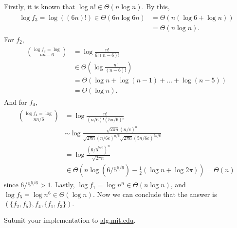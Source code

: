 \documentclass[12pt,twoside]{article}
\begin{document}
\begin{problems}
\begin{problemparts}
  \problempart %
  Firstly, it is known that $\log n! \in \Theta(n\log n)$. By this,
  \begin{align}
    \begin{split}
      \log f_3 = \log((6n)!) \in \Theta(6n\log{6n}) &= \Theta(n(\log 6 + \log n)) \\
                                                    &= \Theta(n\log n).
    \end{split}
  \end{align}
  For $f_2$,
  \begin{align}
    \begin{split}
      \log f_2 = \log\choose{n}{n-6} &= \log\frac{n!}{6!(n-6)!} \\
                                     &\in \Theta\left(\log\frac{n!}{(n-6)!}\right) \\
                                     &= \Theta(\log n + \log(n-1) + \dots + \log(n-5)) \\
                                     &= \Theta(\log n).
    \end{split}
  \end{align}
  And for $f_4$,
  \begin{align}
    \begin{split}
      \log f_4 = \log\choose{n}{n/6} &= \log\frac{n!}{(n/6)!(5n/6)!} \\
                                     &\sim\log\frac{\sqrt{2\pi n}(n/e)^n}{\sqrt{2\pi n}(n/6e)^{n/6}\sqrt{2\pi n}(5n/6e)^{5n/6}} \\
                                     &= \log\frac{(6/5^{5/6})^n}{\sqrt{2\pi n}} \\
                                     &\in \Theta\left(n\log(6/5^{5/6}) - \frac{1}{2}(\log n + \log 2\pi)\right) = \Theta(n)
    \end{split}
  \end{align}
  since $6/5^{5/6} > 1$. Lastly,
  $\log f_1 = \log{n^n} \in\Theta(n\log n)$, and
  $\log f_5 = \log n^6 \in\Theta(\log n)$.
  Now we can conclude that the answer is $(\{f_2, f_5\}, f_4, \{f_1, f_3\})$.

  \problempart %
  
\end{problemparts}

\newpage
\problem  %

\begin{problemparts}
\problempart %
\problempart %
\end{problemparts}

\newpage
\problem  %

\newpage
\problem  %

\begin{problemparts}
\problempart %
\problempart %
\problempart %
\problempart Submit your implementation to {\small\url{alg.mit.edu}}.
\end{problemparts}

\end{problems}
\end{document}
